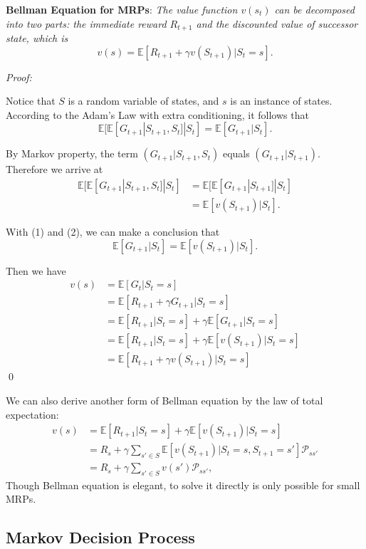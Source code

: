 \documentclass{progartcn}
\begin{document}
		\textbf{Bellman Equation for MRPs}: \textit{The value function $v(s_t)$ can be decomposed into two parts: the immediate reward $R_{t+1}$ and the discounted value of successor state, which is}
		\[v(s)=\mathbb{E}[R_{t+1}+\gamma v(S_{t+1})|S_t=s].\]

		\textit{Proof:} 

		Notice that $S$ is a random variable of states, and $s$ is an instance of states. According to the Adam's Law with extra conditioning, it follows that 
		\[\mathbb{E}[\mathbb{E}[G_{t+1}|S_{t+1},S_t]|S_t]=\mathbb{E}[G_{t+1}|S_t].\tag{1}\]

		By Markov property, the term $(G_{t+1}|S_{t+1},S_t)$ equals $(G_{t+1}|S_{t+1})$. Therefore we arrive at
		\begin{align*}
		\mathbb{E}[\mathbb{E}[G_{t+1}|S_{t+1},S_t]|S_t]&=\mathbb{E}[\mathbb{E}[G_{t+1}|S_{t+1}]|S_t]\\
		&=\mathbb{E}[v(S_{t+1})|S_t].\tag{2}
		\end{align*}

		With (1) and (2), we can make a conclusion that
		\[\mathbb{E}[G_{t+1}|S_t]=\mathbb{E}[v(S_{t+1})|S_t].\tag{3}\]

		Then we have
		\begin{align*}
		v(s) &=\mathbb{E}[G_t|S_t=s]\\
		&=\mathbb{E}[R_{t+1}+\gamma G_{t+1}|S_t=s]\\
		&=\mathbb{E}[R_{t+1}|S_t=s]+\gamma \mathbb{E}[G_{t+1}|S_t=s]\\
		&=\mathbb{E}[R_{t+1}|S_t=s]+\gamma \mathbb{E}[v(S_{t+1})|S_t=s]\tag{by (3)}\\
		&=\mathbb{E}[R_{t+1}+\gamma v(S_{t+1})|S_t=s]
		\end{align*}
		\qed

		We can also derive another form of Bellman equation by the law of total expectation:
		\begin{align*}
		v(s) &=\mathbb{E}[R_{t+1}|S_t=s]+\gamma \mathbb{E}[v(S_{t+1})|S_t=s]\\
		&=R_s+\gamma\sum_{s'\in S}\mathbb{E}[v(S_{t+1})|S_t=s, S_{t+1}=s']\mathcal{P}_{ss'}\tag{by LOTE}\\
		&=R_s + \gamma \sum_{s'\in S} v(s')\mathcal{P}_{ss'},
		\end{align*}
		Though Bellman equation is elegant, to solve it directly is only possible for small MRPs.\\

	\subsection{Markov Decision Process}
\end{document}
